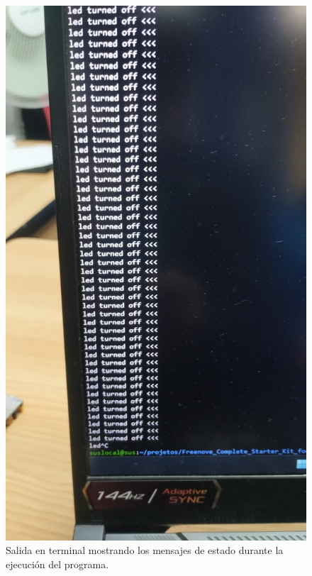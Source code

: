 \begin{figure}[h]
	\centering
	\includegraphics[width=0.5\textheight]{imagenes/2.jpg}
	\caption{Salida en terminal mostrando los mensajes de estado durante la ejecución del programa.}
	\label{fig:terminal}
\end{figure}

